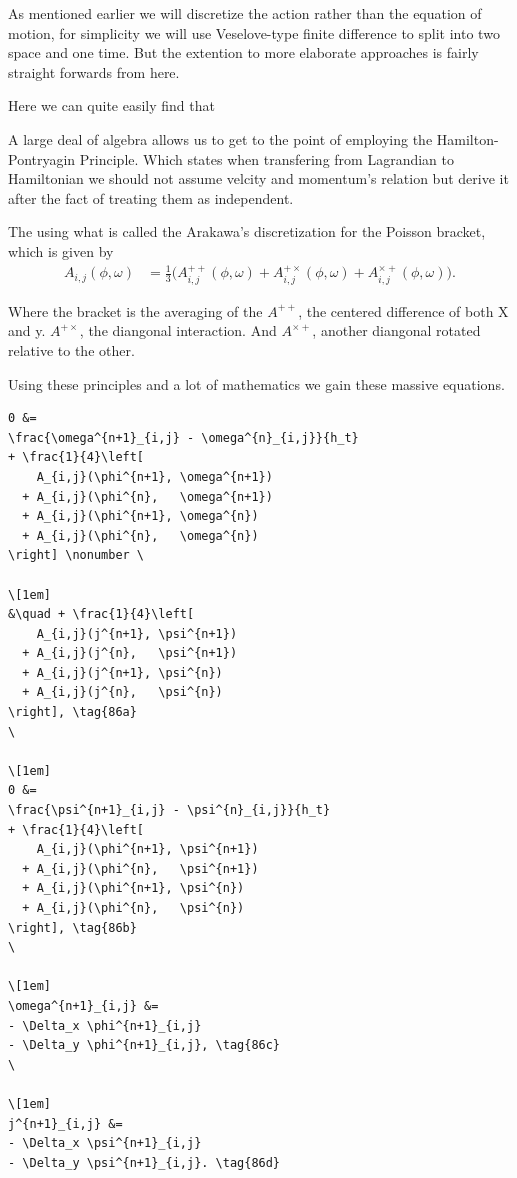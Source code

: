 As mentioned earlier we will discretize the action rather than the equation of motion, for simplicity we will use Veselove-type finite difference to split into two space and one time. But the extention to more elaborate approaches is fairly straight forwards from here.

Here we can quite easily find that

A large deal of algebra allows us to get to the point of employing the Hamilton-Pontryagin Principle. Which states when transfering from Lagrandian to Hamiltonian we should not assume velcity and momentum's relation but derive it after the fact of treating them as independent.

The using what is called the Arakawa's discretization for the Poisson bracket, which is given by
\begin{align}
A_{i,j}(\phi,\omega)
&= \frac{1}{3} \Big(
    A^{++}_{i,j}(\phi,\omega)
  + A^{+\times}_{i,j}(\phi,\omega)
  + A^{\times+}_{i,j}(\phi,\omega)
\Big).
\end{align}

Where the bracket is the averaging of the $A^{++}$, the centered difference of both X and y. $A^{+ \times}$, the diangonal interaction. And $A^{\times +}$, another diangonal rotated relative to the other.

Using these principles and a lot of mathematics we gain these massive equations.
\begin{verbatim}
0 &=
\frac{\omega^{n+1}_{i,j} - \omega^{n}_{i,j}}{h_t}
+ \frac{1}{4}\left[
    A_{i,j}(\phi^{n+1}, \omega^{n+1})
  + A_{i,j}(\phi^{n},   \omega^{n+1})
  + A_{i,j}(\phi^{n+1}, \omega^{n})
  + A_{i,j}(\phi^{n},   \omega^{n})
\right] \nonumber \

\[1em]
&\quad + \frac{1}{4}\left[
    A_{i,j}(j^{n+1}, \psi^{n+1})
  + A_{i,j}(j^{n},   \psi^{n+1})
  + A_{i,j}(j^{n+1}, \psi^{n})
  + A_{i,j}(j^{n},   \psi^{n})
\right], \tag{86a}
\

\[1em]
0 &=
\frac{\psi^{n+1}_{i,j} - \psi^{n}_{i,j}}{h_t}
+ \frac{1}{4}\left[
    A_{i,j}(\phi^{n+1}, \psi^{n+1})
  + A_{i,j}(\phi^{n},   \psi^{n+1})
  + A_{i,j}(\phi^{n+1}, \psi^{n})
  + A_{i,j}(\phi^{n},   \psi^{n})
\right], \tag{86b}
\

\[1em]
\omega^{n+1}_{i,j} &=
- \Delta_x \phi^{n+1}_{i,j}
- \Delta_y \phi^{n+1}_{i,j}, \tag{86c}
\

\[1em]
j^{n+1}_{i,j} &=
- \Delta_x \psi^{n+1}_{i,j}
- \Delta_y \psi^{n+1}_{i,j}. \tag{86d}
\end{verbatim}


